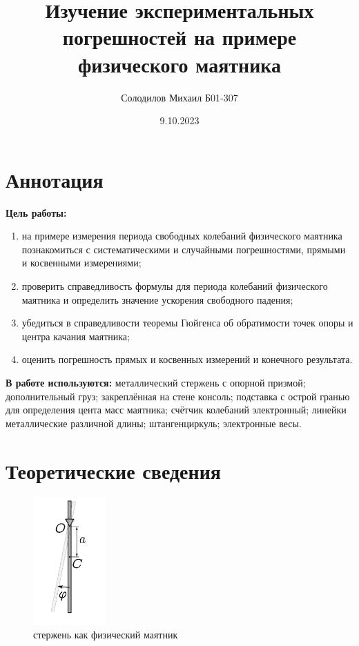 \documentclass[12pt, a4paper]{article}
\title{\textbf{Изучение экспериментальных погрешностей на
примере физического маятника}}
\author{Солодилов Михаил Б01-307}
\date{9.10.2023}
\begin{document}
\maketitle
\tableofcontents

\newpage

\section{Аннотация}

\textbf{Цель работы:}
\begin{enumerate}
    \item на примере измерения периода свободных колебаний физического
    маятника познакомиться с систематическими и случайными погрешностями, 
    прямыми и косвенными измерениями;
    \item  проверить справедливость формулы для периода колебаний физического
    маятника и определить значение ускорения свободного падения;
    \item убедиться в справедливости теоремы Гюйгенса об обратимости
    точек опоры и центра качания маятника;
    \item оценить погрешность прямых и косвенных измерений и конечного
    результата.
\end{enumerate}

\textbf{В работе используются:} металлический стержень с опорной призмой;
дополнительный груз; закреплённая на стене консоль; подставка с острой гранью
для определения цента масс маятника; счётчик колебаний электронный; линейки
металлические различной длины; штангенциркуль; электронные весы.

\newpage

\section{Теоретические сведения}

\begin{figure}
    \centering
    \includegraphics[width = 0.25\textwidth]{Figure 1}
    \caption{стержень как физический маятник}
\end{figure}
\end{document}
